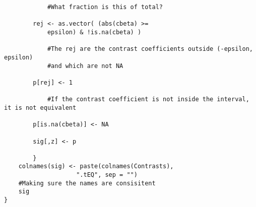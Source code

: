 \begin{verbatim}
			#What fraction is this of total?
			
		rej <- as.vector( (abs(cbeta) >= 
			epsilon) & !is.na(cbeta) )
			
			#The rej are the contrast coefficients outside (-epsilon, epsilon)
			#and which are not NA
			
		p[rej] <- 1
		
			#If the contrast coefficient is not inside the interval, it is not equivalent
			
		p[is.na(cbeta)] <- NA	
				
		sig[,z] <- p
			
		}
	colnames(sig) <- paste(colnames(Contrasts),
					".tEQ", sep = "")
	#Making sure the names are consisitent					
	sig
}		

\end{verbatim}